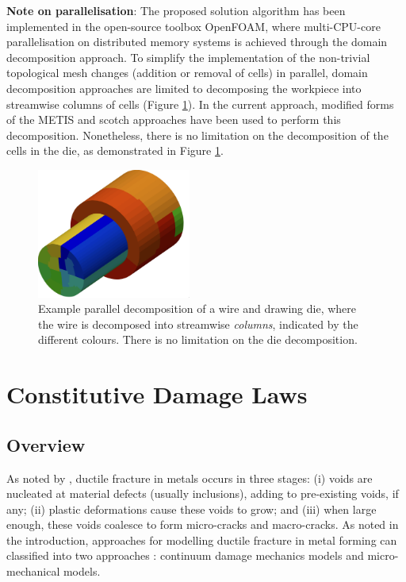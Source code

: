 \documentclass[sn-mathphys,Numbered]{sn-jnl}%
\begin{document}
\textbf{Note on parallelisation}: The proposed solution algorithm has been implemented in the open-source toolbox OpenFOAM, where multi-CPU-core parallelisation on distributed memory systems is achieved through the domain decomposition approach.
To simplify the implementation of the non-trivial topological mesh changes (addition or removal of cells) in parallel, domain decomposition approaches are limited to decomposing the workpiece into streamwise columns of cells (Figure \ref{fig:layerAdditionParallel}).
In the current approach, modified forms of the METIS \cite{metis} and scotch \cite{scotch} approaches have been used to perform this decomposition.
Nonetheless, there is no limitation on the decomposition of the cells in the die, as demonstrated in Figure \ref{fig:layerAdditionParallel}.
\begin{figure}[tbh]
	\centering
	\includegraphics[width=0.45\textwidth]{./Figures/layerAddition/parallel}
	\caption{Example parallel decomposition of a wire and drawing die, where the wire is decomposed into streamwise \emph{columns}, indicated by the different colours. There is no limitation on the die decomposition.}
	\label{fig:layerAdditionParallel}
\end{figure}




\section{Constitutive Damage Laws} \label{sec:constitutive_laws}


\subsection{Overview}

As noted by \citet{garrison_ductile_1987}, ductile fracture in metals occurs in three stages: (i) voids are nucleated at material defects (usually inclusions), adding to pre-existing voids, if any; (ii) plastic deformations cause these voids to grow; and (iii) when large enough, these voids coalesce to form micro-cracks and macro-cracks.
As noted in the introduction, approaches for modelling ductile fracture in metal forming can classified into two approaches \citep{cao_models_2017, tekkaya_damage_2020}: continuum damage mechanics models and micro-mechanical models.
\end{document}
